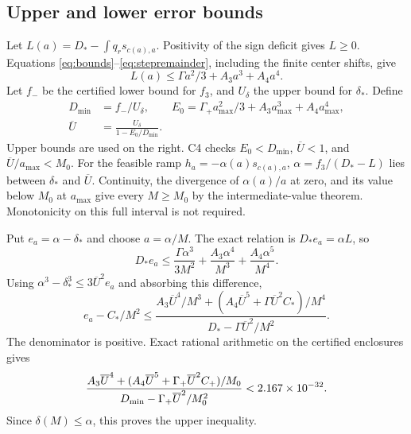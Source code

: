 \documentclass[11pt,a4paper]{article}
\numberwithin{equation}{section}
\theoremstyle{remark}\newtheorem{remark}[theorem]{Remark}
\newcommand{\ds}{\delta_*}
\newcommand{\Ds}{D_*}
\newcommand{\Cs}{C_*}
\begin{document}
\subsection{Upper and lower error bounds}
Let $L(a)=\Ds-\int q_rs_{c(a),a}$. Positivity of the sign deficit gives
$L\ge0$. Equations \eqref{eq:bounds}--\eqref{eq:stepremainder}, including
the finite center shifts, give
\begin{equation}
 L(a)\le\Gamma a^2/3+A_3a^3+A_4a^4.\label{eq:loss}
\end{equation}
Let $f_-$ be the certified lower bound for $f_3$, and $U_\delta$ the upper
bound for $\ds$. Define
\begin{align}
 D_{\min}&=f_-/U_\delta,\qquad
 E_0=\Gamma_+a_{\max}^2/3+A_3a_{\max}^3+A_4a_{\max}^4,\\
 \overline U&=\frac{U_\delta}{1-E_0/D_{\min}}.\label{eq:Ubar}
\end{align}
Upper bounds are used on the right. C4 checks
$E_0<D_{\min}$, $\overline U<1$, and $\overline U/a_{\max}<M_0$.
For the feasible ramp $h_a=-\alpha(a)s_{c(a),a}$,
$\alpha=f_3/(\Ds-L)$ lies between $\ds$ and $\overline U$.
Continuity, the divergence of $\alpha(a)/a$ at zero, and its value below
$M_0$ at $a_{\max}$ give every $M\ge M_0$ by the intermediate-value
theorem. Monotonicity on this full interval is not required.

Put $e_a=\alpha-\ds$ and choose $a=\alpha/M$. The exact relation is
$\Ds e_a=\alpha L$, so
\begin{equation}
 \Ds e_a\le\frac{\Gamma\alpha^3}{3M^2}
 +\frac{A_3\alpha^4}{M^3}+\frac{A_4\alpha^5}{M^4}.
\end{equation}
Using $\alpha^3-\ds^3\le3\overline U^2e_a$ and absorbing this difference,
\begin{equation}
 e_a-\Cs/M^2\le
 \frac{A_3\overline U^4/M^3+
       (A_4\overline U^5+\Gamma\overline U^2\Cs)/M^4}
      {\Ds-\Gamma\overline U^2/M^2}.\label{eq:absorb}
\end{equation}
The denominator is positive. Exact rational arithmetic on the certified
enclosures gives
\begin{equation}
 \frac{A_3\overline U^4+
 (A_4\overline U^5+\Gamma_+\overline U^2C_+)/M_0}
 {D_{\min}-\Gamma_+\overline U^2/M_0^2}<2.167\times10^{-32}.\label{eq:Kplus}
\end{equation}
Since $\delta(M)\le\alpha$, this proves the upper inequality.
\end{document}

